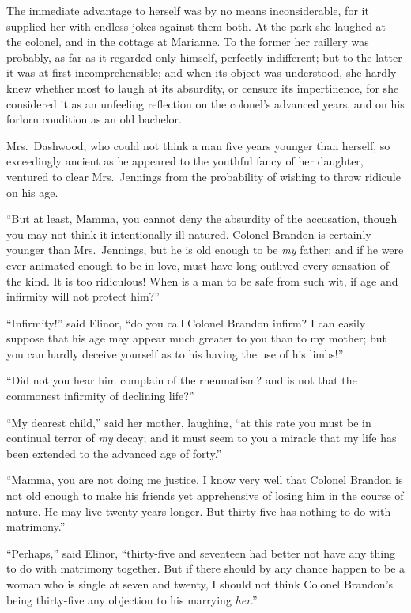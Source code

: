 \documentclass{article}
\begin{document}
The immediate advantage to herself was by no means
inconsiderable, for it supplied her with endless jokes
against them both.  At the park she laughed at the colonel,
and in the cottage at Marianne.  To the former her
raillery was probably, as far as it regarded only himself,
perfectly indifferent; but to the latter it was at
first incomprehensible; and when its object was understood,
she hardly knew whether most to laugh at its absurdity,
or censure its impertinence, for she considered it as an
unfeeling reflection on the colonel's advanced years,
and on his forlorn condition as an old bachelor.

Mrs.\ Dashwood, who could not think a man five years
younger than herself, so exceedingly ancient as he appeared
to the youthful fancy of her daughter, ventured to clear
Mrs.\ Jennings from the probability of wishing to throw
ridicule on his age.

``But at least, Mamma, you cannot deny the absurdity
of the accusation, though you may not think it intentionally
ill-natured.  Colonel Brandon is certainly younger than
Mrs.\ Jennings, but he is old enough to be \emph{my} father;
and if he were ever animated enough to be in love,
must have long outlived every sensation of the kind.
It is too ridiculous!  When is a man to be safe from such wit,
if age and infirmity will not protect him?''

``Infirmity!'' said Elinor, ``do you call Colonel Brandon
infirm?  I can easily suppose that his age may appear much
greater to you than to my mother; but you can hardly
deceive yourself as to his having the use of his limbs!''

``Did not you hear him complain of the rheumatism?
and is not that the commonest infirmity of declining life?''

``My dearest child,'' said her mother, laughing,
``at this rate you must be in continual terror of \emph{my} decay;
and it must seem to you a miracle that my life has been
extended to the advanced age of forty.''

``Mamma, you are not doing me justice.  I know very well
that Colonel Brandon is not old enough to make his friends
yet apprehensive of losing him in the course of nature.
He may live twenty years longer.  But thirty-five has
nothing to do with matrimony.''

``Perhaps,'' said Elinor, ``thirty-five and seventeen had
better not have any thing to do with matrimony together.
But if there should by any chance happen to be a woman
who is single at seven and twenty, I should not think
Colonel Brandon's being thirty-five any objection to his
marrying \emph{her}.''
\end{document}
